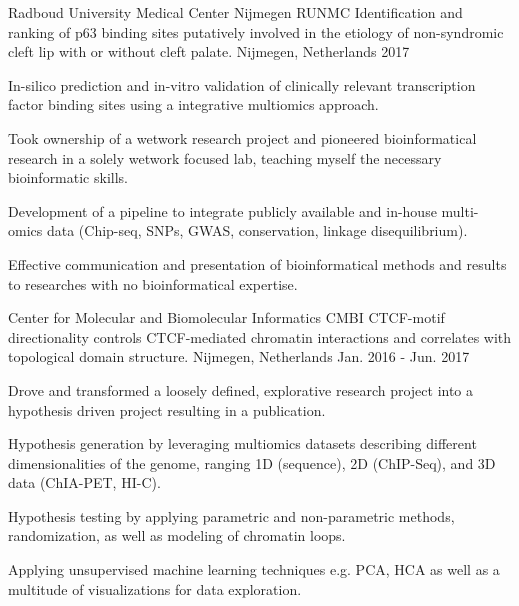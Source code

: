 

\begin{cventries}

  \cventry
    {Radboud University Medical Center Nijmegen RUNMC} %
    {Identification and ranking of p63 binding sites putatively
    involved in the etiology of non-syndromic cleft lip with or
    without cleft palate.} %
    {Nijmegen, Netherlands} %
    {2017} %
    {
      \begin{cvitems} %
        \item {In-silico prediction and in-vitro validation of clinically relevant transcription factor binding sites using a integrative multiomics approach.}
        \item {Took ownership of a wetwork research project and pioneered bioinformatical research in a solely wetwork focused lab, teaching myself the necessary bioinformatic skills.}
        \item {Development of a pipeline to integrate publicly available and in-house multi-omics data (Chip-seq, SNPs, GWAS, conservation, linkage disequilibrium).}
        \item {Effective communication and presentation of bioinformatical methods and results to researches with no bioinformatical expertise.}
      \end{cvitems}
    }

  \cventry
    {Center for Molecular and Biomolecular Informatics CMBI} %
    {CTCF-motif directionality controls CTCF-mediated chromatin interactions
    and correlates with topological domain structure.} %
    {Nijmegen, Netherlands} %
    {Jan. 2016 - Jun. 2017} %
    {
      \begin{cvitems} %
        \item {Drove and transformed a loosely defined, explorative research project into a hypothesis driven project resulting in a publication.}
        \item {Hypothesis generation by leveraging multiomics datasets describing different dimensionalities of the genome, ranging 1D (sequence), 2D (ChIP-Seq), and 3D data (ChIA-PET, HI-C).}
        \item {Hypothesis testing by applying parametric and non-parametric methods, randomization, as well as modeling of chromatin loops.}
        \item {Applying unsupervised machine learning techniques e.g. PCA, HCA as well as a multitude of visualizations for data exploration.}
      \end{cvitems}
    }
\end{cventries}

